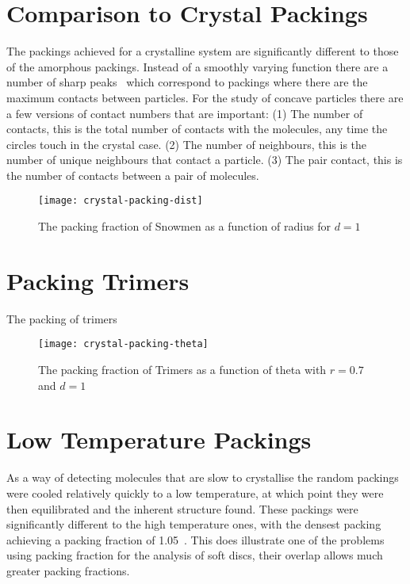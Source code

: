 \section{Comparison to Crystal Packings}

The packings achieved for a crystalline system are significantly different to those of the amorphous packings. Instead of a smoothly varying function there are a number of sharp peaks~ which correspond to packings where there are the maximum contacts between particles. For the study of concave particles there are a few versions of contact numbers that are important: (1) The number of contacts, this is the total number of contacts with the molecules, any time the circles touch in the crystal case. (2) The number of neighbours, this is the number of unique neighbours that contact a particle. (3) The pair contact, this is the number of contacts between a pair of molecules. 

\begin{figure}
    \texttt{[image: crystal-packing-dist]}
    \caption{The packing fraction of Snowmen as a function of radius for $d=1$}
    \label{fig:crystal packing dist}
\end{figure}


\section{Packing Trimers}

The packing of trimers



\begin{figure}
    \texttt{[image: crystal-packing-theta]}
    \caption{The packing fraction of Trimers as a function of theta with $r=0.7$ and $d=1$}
    \label{fig:crystal packing theta}
\end{figure}

\section{Low Temperature Packings}

As a way of detecting molecules that are slow to crystallise the random packings were cooled relatively quickly to a low temperature, at which point they were then equilibrated and the inherent structure found. These packings were significantly different to the high temperature ones, with the densest packing achieving a packing fraction of 1.05\tocheck~. This does illustrate one of the problems using packing fraction for the analysis of soft discs, their overlap allows much greater packing fractions.


